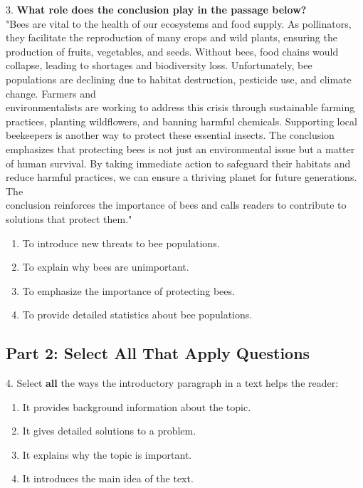 \documentclass[12pt]{article}
\begin{document}
3. \textbf{What role does the conclusion play in the passage below?}\\
"Bees are vital to the health of our ecosystems and food supply. As pollinators, they facilitate the reproduction of many crops and wild plants, ensuring the production of fruits, vegetables, and seeds. Without bees, food chains would collapse, leading to shortages and biodiversity loss. Unfortunately, bee populations are declining due to habitat destruction, pesticide use, and climate change. Farmers and \\environmentalists are working to address this crisis through sustainable farming practices, planting wildflowers, and banning harmful chemicals. Supporting local beekeepers is another way to protect these essential insects. The conclusion \\emphasizes that protecting bees is not just an environmental issue but a matter of human survival. By taking immediate action to safeguard their habitats and reduce harmful practices, we can ensure a thriving planet for future generations. The \\conclusion reinforces the importance of bees and calls readers to contribute to \\solutions that protect them."\\
\begin{enumerate}[label=\Alph*.]
    \item To introduce new threats to bee populations.  
    \item To explain why bees are unimportant.  
    \item To emphasize the importance of protecting bees.  
    \item To provide detailed statistics about bee populations.  
\end{enumerate}

\newpage

\subsection*{Part 2: Select All That Apply Questions}

4. Select \textbf{all} the ways the introductory paragraph in a text helps the reader:\\
\begin{enumerate}[label=\Alph*.]
    \item It provides background information about the topic.  
    \item It gives detailed solutions to a problem.  
    \item It explains why the topic is important.  
    \item It introduces the main idea of the text.  
\end{enumerate}
\end{document}
